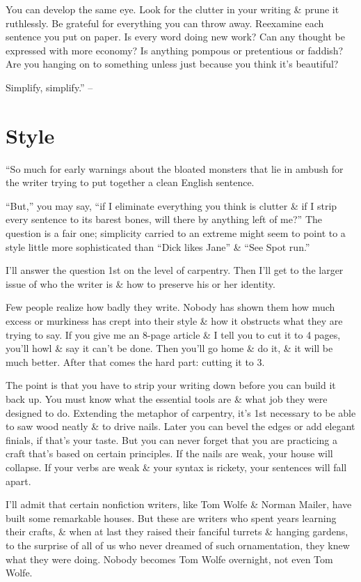 \documentclass{article}
\begin{document}
You can develop the same eye. Look for the clutter in your writing \& prune it ruthlessly. Be grateful for everything you can throw away. Reexamine each sentence you put on paper. Is every word doing new work? Can any thought be expressed with more economy? Is anything pompous or pretentious or faddish? Are you hanging on to something unless just because you think it's beautiful?

Simplify, simplify.'' -- \cite[pp. 19--22]{Zinsser2016}


\section{Style}
``So much for early warnings about the bloated monsters that lie in ambush for the writer trying to put together a clean English sentence.

``But,'' you may say, ``if I eliminate everything you think is clutter \& if I strip every sentence to its barest bones, will there by anything left of me?'' The question is a fair one; simplicity carried to an extreme might seem to point to a style little more sophisticated than ``Dick likes Jane'' \& ``See Spot run.''

I'll answer the question 1st on the level of carpentry. Then I'll get to the larger issue of who the writer is \& how to preserve his or her identity.

Few people realize how badly they write. Nobody has shown them how much excess or murkiness has crept into their style \& how it obstructs what they are trying to say. If you give me an 8-page article \& I tell you to cut it to 4 pages, you'll howl \& say it can't be done. Then you'll go home \& do it, \& it will be much better. After that comes the hard part: cutting it to 3.

The point is that you have to strip your writing down before you can build it back up. You must know what the essential tools are \& what job they were designed to do. Extending the metaphor of carpentry, it's 1st necessary to be able to saw wood neatly \& to drive nails. Later you can bevel the edges or add elegant finials, if that's your taste. But you can never forget that you are practicing a craft that's based on certain principles. If the nails are weak, your house will collapse. If your verbs are weak \& your syntax is rickety, your sentences will fall apart.

I'll admit that certain nonfiction writers, like Tom Wolfe \& Norman Mailer, have built some remarkable houses. But these are writers who spent years learning their crafts, \& when at last they raised their fanciful turrets \& hanging gardens, to the surprise of all of us who never dreamed of such ornamentation, they knew what they were doing. Nobody becomes Tom Wolfe overnight, not even Tom Wolfe.
\end{document}
